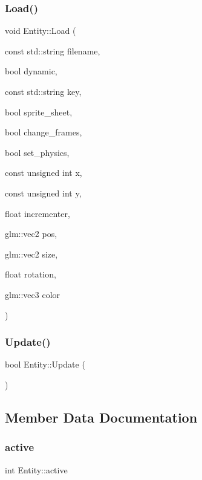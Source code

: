\subsubsection{\texorpdfstring{Load()}{Load()}}
{\footnotesize\ttfamily void Entity\+::\+Load (\begin{DoxyParamCaption}\item[{const std\+::string}]{filename,  }\item[{bool}]{dynamic,  }\item[{const std\+::string}]{key,  }\item[{bool}]{sprite\+\_\+sheet,  }\item[{bool}]{change\+\_\+frames,  }\item[{bool}]{set\+\_\+physics,  }\item[{const unsigned int}]{x,  }\item[{const unsigned int}]{y,  }\item[{float}]{incrementer,  }\item[{glm\+::vec2}]{pos,  }\item[{glm\+::vec2}]{size,  }\item[{float}]{rotation,  }\item[{glm\+::vec3}]{color }\end{DoxyParamCaption})}

\mbox{\label{classEntity_a4417060da59c34999fe3f0b912cacd16}} 
\subsubsection{\texorpdfstring{Update()}{Update()}}
{\footnotesize\ttfamily bool Entity\+::\+Update (\begin{DoxyParamCaption}{ }\end{DoxyParamCaption})}



\subsection{Member Data Documentation}
\mbox{\label{classEntity_aeb5d37f9e2951abb86bb82f1875438a7}} 
\subsubsection{\texorpdfstring{active}{active}}
{\footnotesize\ttfamily int Entity\+::active\hspace{0.3cm}{\ttfamily [protected]}}

